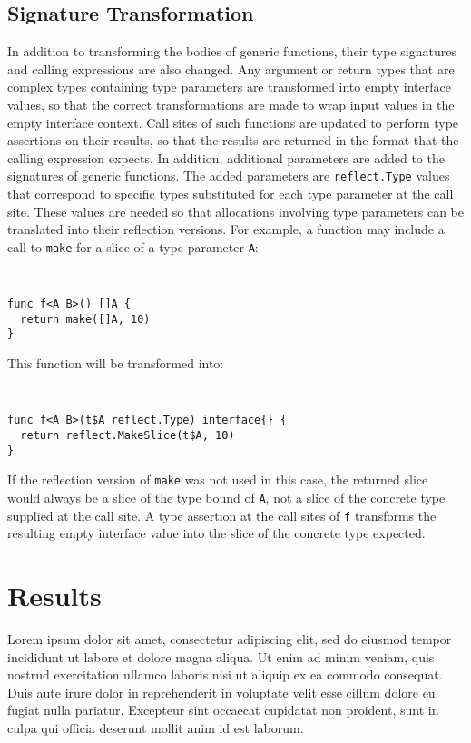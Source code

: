 \documentclass[letterpaper,twocolumn,11pt]{article}
\begin{document}
\subsection{Signature Transformation} \label{signature_transformation}

In addition to transforming the bodies of generic functions, their type signatures and calling expressions are also changed. Any argument or return types that are complex types containing type parameters are transformed into empty interface values, so that the correct transformations are made to wrap input values in the empty interface context. Call sites of such functions are updated to perform type assertions on their results, so that the results are returned in the format that the calling expression expects. In addition, additional parameters are added to the signatures of generic functions. The added parameters are \texttt{reflect.Type} values that correspond to specific types substituted for each type parameter at the call site. These values are needed so that allocations involving type parameters can be translated into their reflection versions. For example, a function may include a call to \texttt{make} for a slice of a type parameter \texttt{A}:
{ \tt \small
\begin{verbatim}
func f<A B>() []A {
  return make([]A, 10)
}
\end{verbatim} 
}
This function will be transformed into:
{ \tt \small
\begin{verbatim}
func f<A B>(t$A reflect.Type) interface{} {
  return reflect.MakeSlice(t$A, 10)
}
\end{verbatim} 
}

If the reflection version of \texttt{make} was not used in this case, the returned slice would always be a slice of the type bound of \texttt{A}, not a slice of the concrete type supplied at the call site. A type assertion at the call sites of \texttt{f} transforms the resulting empty interface value into the slice of the concrete type expected.

\section{Results} \label{results}
Lorem ipsum dolor sit amet, consectetur adipiscing elit, sed do eiusmod tempor incididunt ut labore et dolore magna aliqua. Ut enim ad minim veniam, quis nostrud exercitation ullamco laboris nisi ut aliquip ex ea commodo consequat. Duis aute irure dolor in reprehenderit in voluptate velit esse cillum dolore eu fugiat nulla pariatur. Excepteur sint occaecat cupidatat non proident, sunt in culpa qui officia deserunt mollit anim id est laborum.
\end{document}
